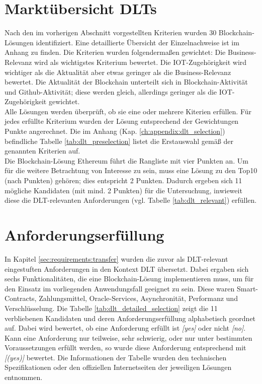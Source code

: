 %
%
\section{Marktübersicht DLTs}
\label{sec:dlt_selection:market}
Nach den im vorherigen Abschnitt vorgestellten Kriterien wurden 30 Blockchain-Lösungen identifiziert. Eine detaillierte Übersicht der Einzelnachweise ist im Anhang zu finden. Die Kriterien wurden folgendermaßen gewichtet: Die Business-Relevanz wird als wichtigstes Kriterium bewertet. Die IOT-Zugehörigkeit wird wichtiger als die Aktualität aber etwas geringer als die Business-Relevanz bewertet. Die Aktualität der Blockchain unterteilt sich in Blockchain-Aktivität und Github-Aktivität; diese werden gleich, allerdings geringer als die IOT-Zugehörigkeit gewichtet.\\
Alle Lösungen werden überprüft, ob sie eine oder mehrere Kiterien erfüllen. Für jedes erfüllte Kriterium wurden der Lösung entsprechend der Gewichtungen Punkte angerechnet. Die im Anhang (Kap. \ref{ch:appendix:dlt_selection}) befindliche Tabelle \ref{tab:dlt_preselection} listet die Erstauswahl gemäß der genannten Kriterien auf.\\
Die Blockchain-Lösung Ethereum führt die Rangliste mit vier Punkten an. Um für die weitere Betrachtung von Interesse zu sein, muss eine Lösung zu den Top10 (nach Punkten) gehören; dies entspricht 2 Punkten. Dadurch ergeben sich 11 mögliche Kandidaten (mit mind. 2 Punkten) für die Untersuchung, inwieweit diese die \ac{DLT}-relevanten Anforderungen (vgl. Tabelle \ref{tab:dlt_relevant}) erfüllen.

%
%
\section{Anforderungserfüllung}
\label{sec:dlt_selection:fullfilment}
In Kapitel \ref{sec:requirements:transfer} wurden die zuvor als \ac{DLT}-relevant eingestuften Anforderungen in den Kontext \ac{DLT} übersetzt. Dabei ergaben sich sechs Funktionalitäten, die eine Blockchain-Lösung implementieren muss, um für den Einsatz im vorliegenden Anwendungsfall geeignet zu sein. Diese waren Smart-Contracts, Zahlungsmittel, Oracle-Services, Asynchronität, Performanz und Verschlüsselung. Die Tabelle \ref{tab:dlt_detailed_selection} zeigt die 11 verbliebenen Kandidaten und deren Anforderungserfüllung alphabetisch geordnet auf. Dabei wird bewertet, ob eine Anforderung erfüllt ist \textit{[yes]} oder nicht \textit{[no]}. Kann eine Anforderung nur teilweise, sehr schwierig, oder nur unter bestimmten Voraussetzungen erfüllt werden, so wurde diese Anforderung entsprechend mit \textit{[(yes)]} bewertet. Die Informationen der Tabelle wurden den technischen Spezifikationen oder den offiziellen Internetseiten der jeweiligen Lösungen entnommen.

